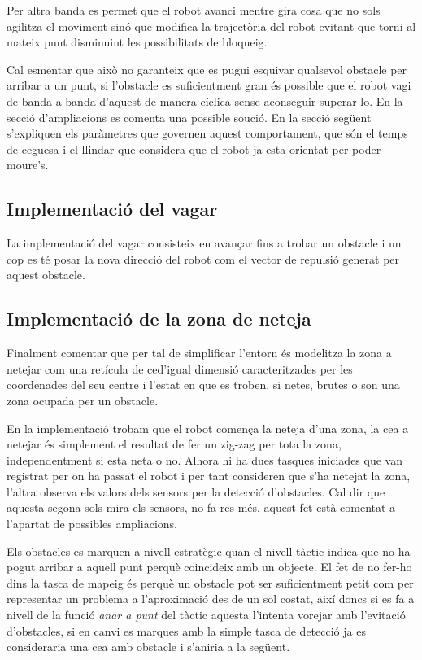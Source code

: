 Per altra banda es permet que el robot avanci mentre gira cosa que no sols agilitza el moviment sinó que
modifica la trajectòria del robot evitant que torni al mateix punt disminuint les possibilitats de bloqueig.

Cal esmentar que això no garanteix que es pugui esquivar qualsevol obstacle per arribar a un punt, 
si l'obstacle es suficientment gran és possible que el robot vagi de banda a banda d'aquest de manera
cíclica sense aconseguir superar-lo. En la secció d'ampliacions es comenta una possible so\lgem ució. En
la secció següent s'expliquen els paràmetres que governen aquest comportament, que són el temps
de ceguesa i el llindar que considera que el robot ja esta orientat per poder moure's.

\subsection{Implementació del vagar}

La implementació del vagar consisteix en avançar fins a trobar un obstacle i un cop es té posar 
la nova direcció del robot com el vector de repulsió generat per aquest obstacle.

\subsection{Implementació de la zona de neteja}

Finalment comentar que per tal de simplificar l'entorn és modelitza la zona a netejar com una retícula
de ce\lgem d'igual dimensió caracteritzades per les coordenades del seu centre i l'estat en que es troben,
si netes, brutes o son una zona ocupada per un obstacle.

En la implementació trobam que el robot comença la neteja d'una zona, la ce\lgem a a netejar és simplement
el resultat de fer un zig-zag per tota la zona, independentment si esta neta o no. Alhora hi ha dues tasques
iniciades que van registrat per on ha passat el robot i per tant consideren que s'ha netejat la zona, l'altra
observa els valors dels sensors per la detecció d'obstacles. Cal dir que aquesta segona sols mira els sensors,
no fa res més, aquest fet està comentat a l'apartat de possibles ampliacions.

Els obstacles es marquen a nivell estratègic quan el nivell tàctic indica que no ha pogut arribar a aquell
punt perquè coincideix amb un objecte. El fet de no fer-ho dins la tasca de mapeig és perquè un obstacle
pot ser suficientment petit com per representar un problema a l'aproximació des de un sol costat, així doncs
si es fa a nivell de la funció \emph{anar a punt} del tàctic aquesta l'intenta vorejar amb l'evitació d'obstacles, 
si en canvi es marques amb la simple tasca de detecció ja es consideraria una ce\lgem a amb obstacle i s'aniria a la següent.

